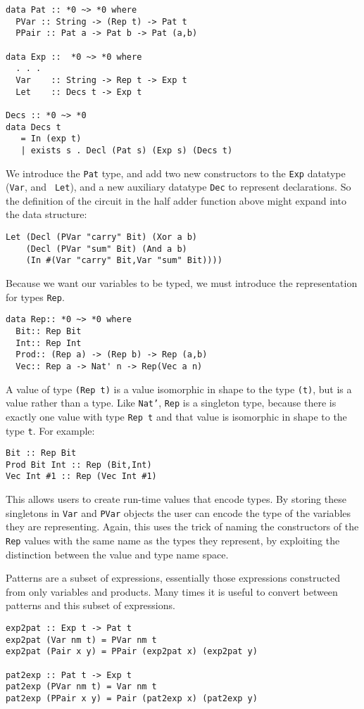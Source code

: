 \documentclass[10pt,twoside]{article}
\begin{document}
\begin{verbatim} 
data Pat :: *0 ~> *0 where
  PVar :: String -> (Rep t) -> Pat t
  PPair :: Pat a -> Pat b -> Pat (a,b)
  
data Exp ::  *0 ~> *0 where
  . . .
  Var    :: String -> Rep t -> Exp t
  Let    :: Decs t -> Exp t
  
Decs :: *0 ~> *0 
data Decs t 
   = In (exp t) 
   | exists s . Decl (Pat s) (Exp s) (Decs t)
\end{verbatim}
We introduce the {\tt Pat} type, and add two new constructors to the {\tt Exp} datatype ({\tt Var}, and {\tt
Let}), and a new auxiliary datatype {\tt Dec} to represent declarations. So
the definition of the circuit in the half adder function above
might expand into the data structure:
\begin{verbatim}
Let (Decl (PVar "carry" Bit) (Xor a b)
    (Decl (PVar "sum" Bit) (And a b)
    (In #(Var "carry" Bit,Var "sum" Bit))))
\end{verbatim}
Because we want our variables to be typed, we must introduce the 
representation for types {\tt Rep}.
\begin{verbatim}
data Rep:: *0 ~> *0 where
  Bit:: Rep Bit
  Int:: Rep Int
  Prod:: (Rep a) -> (Rep b) -> Rep (a,b)
  Vec:: Rep a -> Nat' n -> Rep(Vec a n)
\end{verbatim}
A value of type {\tt (Rep t)} is a value isomorphic in
shape to the type {\tt (t)}, but is a value rather than a type.
Like {\tt Nat'}, {\tt Rep} is a singleton type, because there is exactly one value
with type {\tt Rep t} and that value is isomorphic in shape to the type {\tt t}.
For example:
\begin{verbatim}
Bit :: Rep Bit
Prod Bit Int :: Rep (Bit,Int)
Vec Int #1 :: Rep (Vec Int #1)
\end{verbatim}
This allows users to create run-time values that encode
types. By storing these singletons in {\tt Var} and {\tt PVar} objects
the user can encode the type of the variables they are representing.
Again, this uses the trick of naming the constructors of the {\tt Rep}
values with the same name as the types they represent, by exploiting
the distinction between the value and type name space.

Patterns are a subset of expressions, essentially those expressions
constructed from only variables and products. Many times it is useful
to convert between patterns and this subset of expressions.

\begin{verbatim}
exp2pat :: Exp t -> Pat t
exp2pat (Var nm t) = PVar nm t
exp2pat (Pair x y) = PPair (exp2pat x) (exp2pat y)

pat2exp :: Pat t -> Exp t  
pat2exp (PVar nm t) = Var nm t
pat2exp (PPair x y) = Pair (pat2exp x) (pat2exp y)
\end{verbatim}
\end{document}
